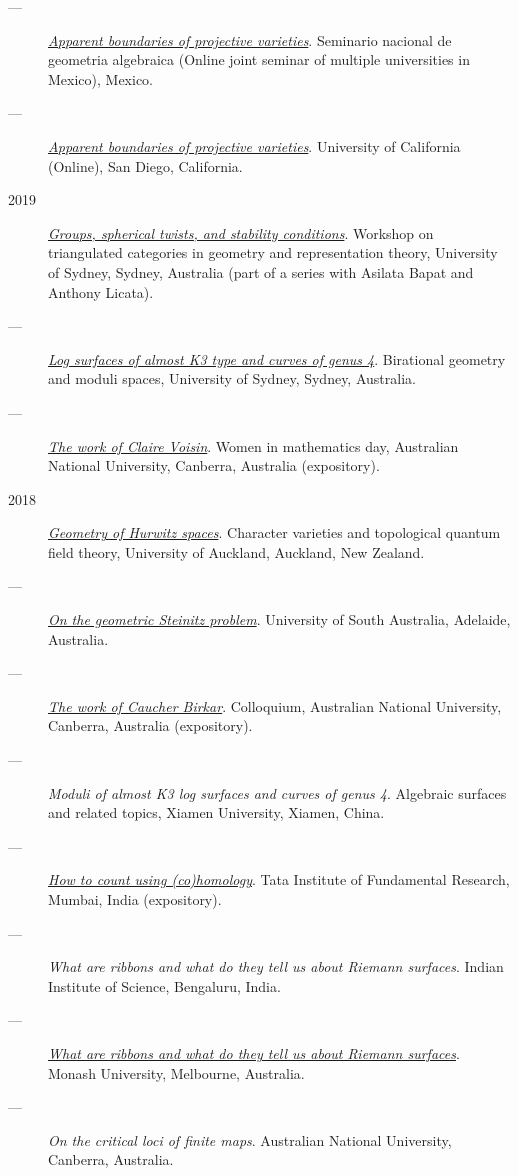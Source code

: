 \documentclass[11pt]{article}
\begin{document}
\begin{description}
\item[{---}] \emph{\href{talks/PR2020-Oaxaca.pdf}{Apparent boundaries of projective varieties}}. Seminario nacional de geometria algebraica (Online joint seminar of multiple universities in Mexico), Mexico.
\item[{---}] \emph{\href{talks/PR2020-UCSD.pdf}{Apparent boundaries of projective varieties}}. University of California (Online), San Diego, California.
\item[{2019}] \emph{\href{talks/StabSydney2019.pdf}{Groups, spherical twists, and stability conditions}}. Workshop on triangulated categories in geometry and representation theory, University of Sydney, Sydney, Australia (part of a series with Asilata Bapat and Anthony Licata).
\item[{---}] \emph{\href{talks/K3Sydney2019.pdf}{Log surfaces of almost K3 type and curves of genus 4}}. Birational geometry and moduli spaces, University of Sydney, Sydney, Australia.
\item[{---}] \emph{\href{talks/WIM2019.pdf}{The work of Claire Voisin}}. Women in mathematics day, Australian National University, Canberra, Australia (expository).
\item[{2018}] \emph{\href{talks/NZ2018.pdf}{Geometry of Hurwitz spaces}}. Character varieties and topological quantum field theory, University of Auckland, Auckland, New Zealand.
\item[{---}] \emph{\href{talks/AustMS2018.pdf}{On the geometric Steinitz problem}}. University of South Australia, Adelaide, Australia.
\item[{---}] \emph{\href{talks/FMColloquium2018.pdf}{The work of Caucher Birkar}}. Colloquium, Australian National University, Canberra, Australia (expository).
\item[{---}] \emph{Moduli of almost K3 log surfaces and curves of genus 4}. Algebraic surfaces and related topics, Xiamen University, Xiamen, China.
\item[{---}] \emph{\href{talks/tifr2018.pdf}{How to count using (co)homology}}. Tata Institute of Fundamental Research, Mumbai, India (expository).
\item[{---}] \emph{What are ribbons and what do they tell us about Riemann surfaces}. Indian Institute of Science, Bengaluru, India.
\item[{---}] \emph{\href{talks/Monash2018.pdf}{What are ribbons and what do they tell us about Riemann surfaces}}. Monash University, Melbourne, Australia.
\item[{---}] \emph{On the critical loci of finite maps}. Australian National University, Canberra, Australia.

\end{description}
\end{document}
